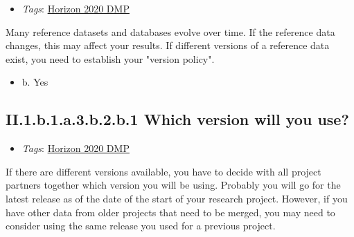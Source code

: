 \documentclass[a4paper,12pt]{report}
\begin{document}
\begin{itemize}
  \item \textit{Tags}: \ul{Horizon 2020 DMP}
  \end{itemize}


\noindent
\begin{markdown}
Many reference datasets and databases evolve over time. If the reference data changes, this may affect your results. If different versions of a reference data exist, you need to establish your "version policy".
\end{markdown}



\begin{itemize}
  \item[\CheckmarkBold] b. Yes
\end{itemize}




\subsection*{\protect\textcolor{colorSecId}{II.1.b.1.a.3.b.2.b.1} Which version will you use?}

\label{82fd0cce-2b41-423f-92ad-636d0872045c.efc80cc8-8318-4f8c-acb7-dc1c60e491c1.2663b978-5125-4224-9930-0a50dbe895c9.fcc51962-08df-4f4c-85ad-6bb932107010.0b1610c4-5030-43a3-8a6c-c69693351a79.58401091-2d48-4231-983a-c972d11d9f6e.8a1937d8-39dc-4efd-a3f6-b62e789f225b.10b6548c-21cd-44c8-a8de-47415e7b012e.842007ce-0951-4655-8acc-b0f582e82ea1.f00a28fb-ac77-4110-b285-c73c8bc62630}


\begin{itemize}
  \item \textit{Tags}: \ul{Horizon 2020 DMP}
  \end{itemize}


\noindent
\begin{markdown}
If there are different versions available, you have to decide with all project partners together which version you will be using. Probably you will go for the latest release as of the date of the start of your research project. However, if you have other data from older projects that need to be merged, you may need to consider using the same release you used for a previous project.
\end{markdown}
\end{document}

